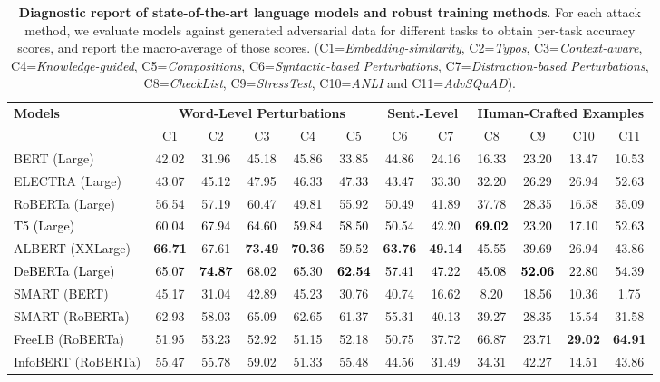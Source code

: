 \documentclass{article}
\newcommand{\m}[1]{{\textcolor{black}{{#1}}}}
\begin{document}
\begin{table}[t]
\small
    \centering
    \caption{\small \textbf{Diagnostic report of state-of-the-art language models and robust training methods}. For each attack method, we evaluate models against generated adversarial data for different tasks to obtain per-task accuracy scores, and report the macro-average of those scores. (C1=\textit{Embedding-similarity}, C2=\textit{Typos}, C3=\textit{Context-aware}, C4=\textit{Knowledge-guided}, C5=\textit{Compositions}, C6=\textit{Syntactic-based Perturbations},
    C7=\textit{Distraction-based Perturbations},
    C8=\textit{CheckList},
    C9=\textit{StressTest},
    C10=\textit{ANLI} and 
    C11=\textit{AdvSQuAD}).}
    \label{tab:report}
\setlength{\tabcolsep}{3.75pt}
    \begin{tabular}{l|ccccc|cc|cccc}
    \toprule
    \multirow{2}{*}{\textbf{Models}} & \multicolumn{5}{c|}{\textbf{Word-Level Perturbations}} & \multicolumn{2}{c|}{\textbf{Sent.-Level}} &  \multicolumn{4}{c}{\textbf{Human-Crafted Examples}}   \\
     & C1 & C2 & C3 & C4 & C5 & C6 & C7 & C8 & C9 & C10 & C11 \\
    \midrule 
    {BERT (Large)} & 42.02 & 31.96 & 45.18 & 45.86 & 33.85 & 44.86 & 24.16 & 16.33 & 23.20 & 13.47 & 10.53 \\
   {ELECTRA (Large)} & 43.07 & 45.12 & 47.95 & 46.33 & 47.33 & 43.47 & 33.30 & 32.20 & 26.29 & 26.94 & 52.63 \\
    {RoBERTa (Large)} & 56.54 & 57.19 & 60.47 & 49.81 & 55.92 & 50.49 & 41.89 & 37.78 & 28.35 & 16.58 & 35.09 \\
    \m{{T5 (Large)}} & \m{60.04} & \m{67.94} & \m{64.60} & \m{59.84} & \m{58.50} & \m{50.54} & \m{42.20} & \m{\textbf{69.02}} & \m{23.20} & \m{17.10} & \m{52.63} \\
    {ALBERT (XXLarge)} & \textbf{66.71} & 67.61 & \textbf{73.49} & \textbf{70.36} & 59.52 & \textbf{63.76} & \textbf{49.14} & 45.55 & 39.69 & 26.94 & 43.86 \\
    \m{{DeBERTa (Large)}} & \m{65.07} & \m{\textbf{74.87}} & \m{68.02} & \m{65.30} & \m{\textbf{62.54}} & \m{57.41} & \m{47.22} & \m{45.08} & \m{\textbf{52.06}} & \m{22.80} & \m{54.39} \\
\midrule
    {SMART (BERT)} & 45.17 & 31.04 & 42.89 & 45.23 & 30.76 & 40.74 & 16.62 & 8.20 & 18.56 & 10.36 & 1.75 \\
    {SMART (RoBERTa)} & 62.93 & 58.03 & 65.09 & 62.65 & 61.37 & 55.31 & 40.13 & 39.27 & 28.35 & 15.54 & 31.58 \\
    {FreeLB (RoBERTa)} & 51.95 & 53.23 & 52.92 & 51.15 & 52.18 & 50.75 & 37.72 & 66.87 & 23.71 & \textbf{29.02} &\textbf{ 64.91} \\
    {InfoBERT (RoBERTa)} & 55.47 & 55.78 & 59.02 & 51.33 & 55.48 & 44.56 & 31.49 & 34.31 & 42.27 & 14.51 & 43.86 \\
    \bottomrule
    \end{tabular}
\end{table}
\end{document}
